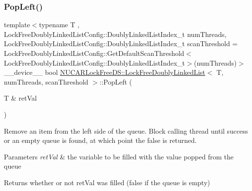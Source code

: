 \subsubsection{\texorpdfstring{Pop\+Left()}{PopLeft()}}
{\footnotesize\ttfamily template$<$typename T , Lock\+Free\+Doubly\+Linked\+List\+Config\+::\+Doubly\+Linked\+List\+Index\+\_\+t num\+Threads, Lock\+Free\+Doubly\+Linked\+List\+Config\+::\+Doubly\+Linked\+List\+Index\+\_\+t scan\+Threshold = Lock\+Free\+Doubly\+Linked\+List\+Config\+::\+Get\+Default\+Scan\+Threshold$<$\+Lock\+Free\+Doubly\+Linked\+List\+Config\+::\+Doubly\+Linked\+List\+Index\+\_\+t$>$(num\+Threads)$>$ \\
\+\_\+\+\_\+device\+\_\+\+\_\+ bool \mbox{\hyperlink{class_n_u_c_a_r_lock_free_d_s_1_1_lock_free_doubly_linked_list}{N\+U\+C\+A\+R\+Lock\+Free\+D\+S\+::\+Lock\+Free\+Doubly\+Linked\+List}}$<$ T, num\+Threads, scan\+Threshold $>$\+::Pop\+Left (\begin{DoxyParamCaption}\item[{T \&}]{ret\+Val }\end{DoxyParamCaption})\hspace{0.3cm}{\ttfamily [inline]}}

Remove an item from the left side of the queue. Block calling thread until success or an empty queue is found, at which point the false is returned. 
\begin{DoxyParams}{Parameters}
{\em ret\+Val} & the variable to be filled with the value popped from the queue \\
\hline
\end{DoxyParams}
\begin{DoxyReturn}{Returns}
whether or not ret\+Val was filled (false if the queue is empty) 
\end{DoxyReturn}
\mbox{\label{class_n_u_c_a_r_lock_free_d_s_1_1_lock_free_doubly_linked_list_a473e2484d607d9e0f93f98ad34e1d893}} 
